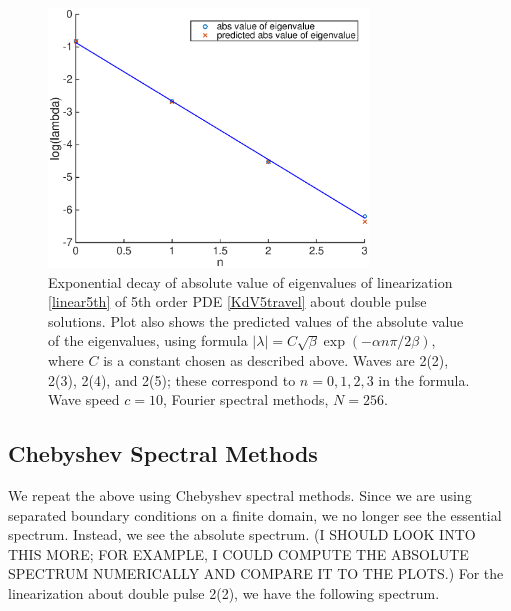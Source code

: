\documentclass[12pt]{article}
\begin{document}
\begin{figure}[H]
	\includegraphics[width=8.5cm]{decayeigenvalue}
	\caption{Exponential decay of absolute value of eigenvalues of linearization \eqref{linear5th} of 5th order PDE \eqref{KdV5travel} about double pulse solutions. Plot also shows the predicted values of the absolute value of the eigenvalues, using formula $|\lambda| = C \sqrt{\beta}\exp{(-\alpha n \pi / 2 \beta)}$, where $C$ is a constant chosen as described above. Waves are 2(2), 2(3), 2(4), and 2(5); these correspond to $n = 0, 1, 2, 3$ in the formula. Wave speed $c = 10$, Fourier spectral methods, $N = 256$.}
\end{figure}

\subsection{Chebyshev Spectral Methods}

We repeat the above using Chebyshev spectral methods. Since we are using separated boundary conditions on a finite domain, we no longer see the essential spectrum. Instead, we see the absolute spectrum. (I SHOULD LOOK INTO THIS MORE; FOR EXAMPLE, I COULD COMPUTE THE ABSOLUTE SPECTRUM NUMERICALLY AND COMPARE IT TO THE PLOTS.) For the linearization about double pulse 2(2), we have the following spectrum.
\end{document}
